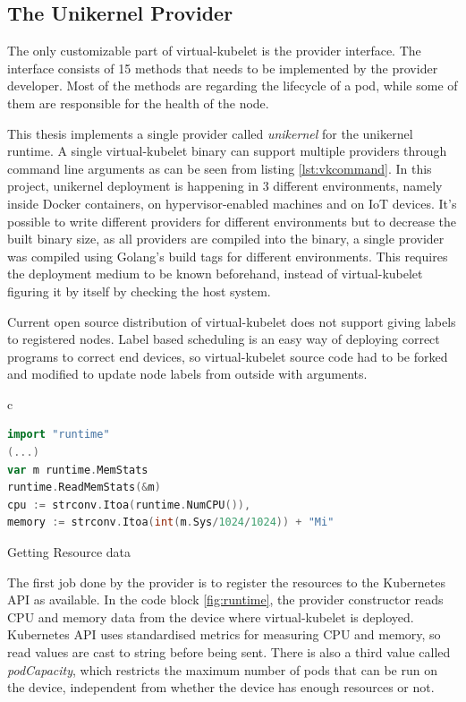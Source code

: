 \subsection{The Unikernel Provider}
The only customizable part of virtual-kubelet is the provider interface. The interface consists of 15 methods that needs to be implemented by the provider developer. Most of the methods are regarding the lifecycle of a pod, while some of them are responsible for the health of the node. 

This thesis implements a single provider called \textit{unikernel} for the unikernel runtime. A single virtual-kubelet binary can support multiple providers through command line arguments as can be seen from listing \ref{lst:vkcommand}. In this project, unikernel deployment is happening in 3 different environments, namely inside Docker containers, on hypervisor-enabled machines and on IoT devices. It's possible to write different providers for different environments but to decrease the built binary size, as all providers are compiled into the binary, a single provider was compiled using Golang's build tags for different environments. This requires the deployment medium to be known beforehand, instead of virtual-kubelet figuring it by itself by checking the host system.

Current open source distribution of virtual-kubelet does not support giving labels to registered nodes. Label based scheduling is an easy way of deploying correct programs to correct end devices, so virtual-kubelet source code had to be forked and modified to update node labels from outside with arguments.

\begin{code}[htpb]
  \centering
  \begin{tabular}{c}
  \begin{lstlisting}[language=go]
import "runtime"
(...)
var m runtime.MemStats
runtime.ReadMemStats(&m)
cpu := strconv.Itoa(runtime.NumCPU()),
memory := strconv.Itoa(int(m.Sys/1024/1024)) + "Mi"

\end{lstlisting}
\end{tabular}
\caption{Getting Resource data}\label{fig:runtime}
\end{code}

The first job done by the provider is to register the resources to the Kubernetes API as available. In the code block \ref{fig:runtime}, the provider constructor reads CPU and memory data from the device where virtual-kubelet is deployed. Kubernetes API uses standardised metrics for measuring CPU and memory, so read values are cast to string before being sent. There is also a third value called \textit{podCapacity}, which restricts the maximum number of pods that can be run on the device, independent from whether the device has enough resources or not.

